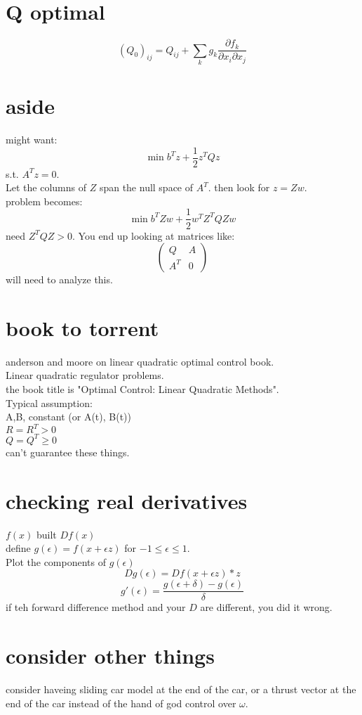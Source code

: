 \documentclass{article}
\begin{document}
\section{Q optimal}
\[(Q_0)_{ij}=Q_{ij}+\sum_kg_k\frac{\partial f_k}{\partial x_i\partial x_j}\]


\section{aside}
might want:\\
\[\min b^Tz+\frac{1}{2}z^TQz\]
s.t. $A^Tz=0$.\\
Let the columns of $Z$ span the null space of $A^T$. then look for $z=Zw$.\\
problem becomes:\\
\[\min b^TZw+\frac{1}{2}w^T Z^TQZw\]
need $Z^TQZ>0$. You end up looking at matrices like:\\
\[\begin{pmatrix}Q&A\\A^T&0\end{pmatrix}\]
will need to analyze this.\\

\section{book to torrent}
anderson and moore on linear quadratic optimal control book.\\
Linear quadratic regulator problems.\\
the book title is "Optimal Control: Linear Quadratic Methods".\\
Typical assumption:\\
A,B, constant (or A(t), B(t))\\
$R=R^T>0$\\
$Q=Q^T\geq 0$\\
can't guarantee these things.

\section{checking real derivatives}
$f(x)$ built $Df(x)$\\
define $g(\epsilon)=f(x+\epsilon z)$ for $-1\leq \epsilon \leq 1$.\\
Plot the components of $g(\epsilon)$\\
\[Dg(\epsilon)=Df(x+\epsilon z)*z\]
\[g'(\epsilon)=\frac{g(\epsilon+\delta)-g(\epsilon)}{\delta}\]
if teh forward difference method and your $D$ are different, you did it wrong.\\

\section{consider other things}
consider haveing sliding car model at the end of the car, or a thrust vector at the end of the car instead of the hand of god control over $\omega$.\\
\end{document}
